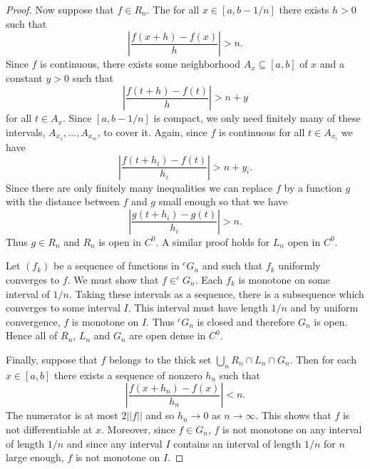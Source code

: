 \documentclass{article}
\begin{document}
\begin{flushleft}
\begin{proof}
Now suppose that $f \in R_n$. The for all $x \in [a, b - 1/n]$ there exists $h > 0$ such that
\[
\left | \frac{f(x+h) - f(x)}{h} \right | > n.
\]
Since $f$ is continuous, there exists some neighborhood $A_x \subseteq [a,b]$ of $x$ and a constant $y > 0$ such that
\[
\left | \frac{f(t+h) - f(t)}{h} \right | > n +y
\]
for all $t \in A_x$. Since $[a, b - 1/n]$ is compact, we only need finitely many of these intervals, $A_{x_1}, \dots , A_{x_m}$, to cover it. Again, since $f$ is continuous for all $t \in A_{x_i}$ we have
\[
\left | \frac{f(t+h_i) - f(t)}{h_i} \right | > n + y_i.
\]
Since there are only finitely many inequalities we can replace $f$ by a function $g$ with the distance between $f$ and $g$ small enough so that we have
\[
\left | \frac{g(t+h_i) - g(t)}{h_i} \right | > n.
\]
Thus $g \in R_n$ and $R_n$ is open in $C^0$. A similar proof holds for $L_n$ open in $C^0$.\newline

Let $(f_k)$ be a sequence of functions in $^c G_n$ and such that $f_k$ uniformly converges to $f$. We must show that $f \in ^c G_n$. Each $f_k$ is monotone on some interval of $1/n$. Taking these intervals as a sequence, there is a subsequence which converges to some interval $I$. This interval must have length $1/n$ and by uniform convergence, $f$ is monotone on $I$. Thus $^cG_n$ is closed and therefore $G_n$ is open. Hence all of $R_n$, $L_n$ and $G_n$ are open dense in $C^0$.\newline

Finally, suppose that $f$ belongs to the thick set $\bigcup_n R_n \cap L_n \cap G_n$. Then for each $x \in [a,b]$ there exists a sequence of nonzero $h_n$ such that
\[
\left | \frac{f(x + h_n) - f(x)}{h_n} \right | < n.
\]
The numerator is at most $2 ||f||$ and so $h_n \rightarrow 0$ as $n \rightarrow \infty$. This shows that $f$ is not differentiable at $x$. Moreover, since $f \in G_n$, $f$ is not monotone on any interval of length $1/n$ and since any interval $I$ contains an interval of length $1/n$ for $n$ large enough, $f$ is not monotone on $I$.
\end{proof}

\end{flushleft}
\end{document}
